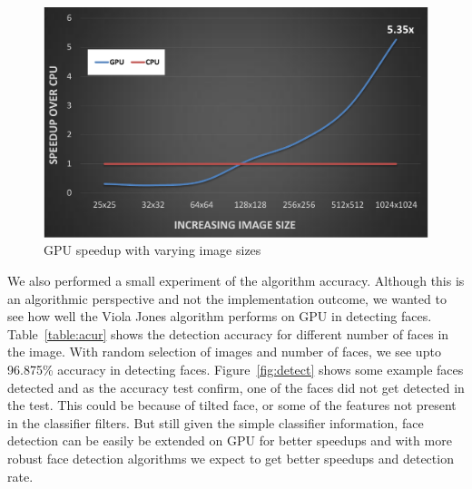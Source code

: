 \begin{figure}[h]
  \centering
  \includegraphics[width=\linewidth]{figs/image_size_crop.pdf}
  \caption{GPU speedup with varying image sizes}
  \vspace{0.05in}
  \label{fig:img_sizes}
\end{figure}

\begin{table}[]
    \centering
        \vspace{0.1in}
        \caption{Face Detection Accuracy on GPU}
        \label{table:acur}
\end{table}


We also performed a small experiment of the algorithm accuracy. Although this is an algorithmic perspective
and not the implementation outcome, we  wanted to see how well the Viola Jones algorithm performs on GPU in detecting faces. 
Table~\ref{table:acur} shows the detection accuracy for different number of faces in the image. With random selection of images and
number of faces, we see upto 96.875\% accuracy in detecting faces. Figure~\ref{fig:detect} shows some example faces detected and as the accuracy test
confirm, one of the faces did not get detected in the test. This could be because of tilted face, or some of the features not present in the classifier filters.
But still given the simple classifier information, face detection can be easily be extended on GPU for better speedups and with more robust face detection algorithms
we expect to get better speedups and detection rate. 

